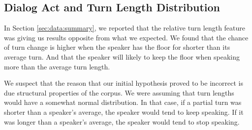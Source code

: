 \subsection{Dialog Act and Turn Length Distribution}
\label{sec:opposite}

In Section \ref {sec:data:summary}, we reported that the relative turn length feature was giving us results opposite from what we expected.  We found that the chance of turn change is higher when the speaker has the floor for shorter than its average turn. And that the speaker will likely to keep the floor when speaking more than the average turn length. 

We suspect that the reason that our initial hypothesis proved to be incorrect is due  structural properties of the corpus.  We were assuming that turn lengths would have a somewhat normal distribution.  In that case, if a partial turn was shorter than a speaker's average, the speaker would tend to keep speaking.  If it was longer than a speaker's average, the speaker would tend to stop speaking.

